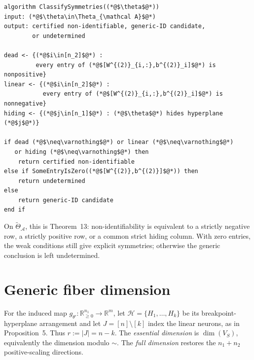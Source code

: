 \documentclass[11pt]{article}
\newcommand{\R}{\mathbb{R}}
\begin{document}
\begin{lstlisting}[caption={Symmetry and identifiability classification}]
algorithm ClassifySymmetries((*@$\theta$@*))
input: (*@$\theta\in\Theta_{\mathcal A}$@*)
output: certified non-identifiable, generic-ID candidate,
        or undetermined

dead <- {(*@$i\in[n_2]$@*) :
         every entry of (*@$[W^{(2)}_{i,:},b^{(2)}_i]$@*) is nonpositive}
linear <- {(*@$i\in[n_2]$@*) :
           every entry of (*@$[W^{(2)}_{i,:},b^{(2)}_i]$@*) is nonnegative}
hiding <- {(*@$j\in[n_1]$@*) : (*@$\theta$@*) hides hyperplane (*@$j$@*)}

if dead (*@$\neq\varnothing$@*) or linear (*@$\neq\varnothing$@*)
   or hiding (*@$\neq\varnothing$@*) then
    return certified non-identifiable
else if SomeEntryIsZero((*@$[W^{(2)},b^{(2)}]$@*)) then
    return undetermined
else
    return generic-ID candidate
end if
\end{lstlisting}

On \(\widetilde{\Theta}_{\mathcal A}\), this is Theorem~13: non-identifiability
is equivalent to a strictly negative row, a strictly positive row, or a common
strict hiding column.  With zero entries, the weak conditions still give
explicit symmetries; otherwise the generic conclusion is left undetermined.

\section{Generic fiber dimension}

For the induced map \(g_{\theta'}:\R_{\geq0}^{n_1}\to\R^m\), let
\(\mathcal H=\{H_1,\ldots,H_k\}\) be its breakpoint-hyperplane arrangement and
let \(J=[n]\setminus[k]\) index the linear neurons, as in Proposition~5.  Thus
\(r:=|J|=n-k\).  The \emph{essential dimension} is \(\dim(V_S)\),
equivalently the dimension modulo \(\sim\).  The \emph{full dimension}
restores the \(n_1+n_2\) positive-scaling directions.
\end{document}
